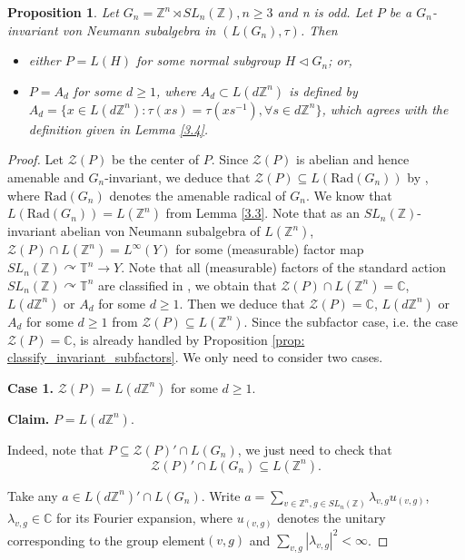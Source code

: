 \documentclass[12pt]{amsart}
\newtheorem{prop}[theorem]{Proposition}
\theoremstyle{definition}
\theoremstyle{remark}
\begin{document}
\begin{prop}\label{prop: version of prop 3.1}
Let $G_{n}=\mathbb{Z}^n\rtimes SL_n(\mathbb{Z}),n\ge3$ and n is odd. Let $P$ be a $G_{n}$-invariant von Neumann subalgebra in $(L(G_{n}),\tau)$. Then 
\begin{itemize}
\item either $P=L(H)$ for some normal subgroup $H\lhd G_{n}$; or,
\item $P=A_d$ for some $d\geq 1$, where $A_d\subset L(d\mathbb{Z}^n)$ is defined by $A_d=\{x\in L(d\mathbb{Z}^n): \tau(xs)=\tau(xs^{-1}), \forall s\in d\mathbb{Z}^n\}$, which agrees with the definition given in Lemma \ref{3.4}.
\end{itemize}
\end{prop}
\begin{proof}
Let $\mathcal{Z}(P)$ be the center of $P$. Since $\mathcal{Z}(P)$ is abelian and hence amenable and $G_n$-invariant, we deduce that $\mathcal{Z}(P) \subseteq L(\text{Rad}(G_n))$ by \cite[Theorem A]{aho}, where $\text{Rad}(G_n)$ denotes the amenable radical of $G_n$. We know that $L(\text{Rad}(G_n)) = L(\mathbb{Z}^n)$ from Lemma \ref{3.3}. Note that as an $SL_n(\mathbb{Z})$-invariant abelian von Neumann subalgebra of $L(\mathbb{Z}^n)$, $\mathcal{Z}(P)\cap L(\mathbb{Z}^n)=L^{\infty}(Y)$ for some (measurable) factor map  $SL_n(\mathbb{Z})\curvearrowright \mathbb{T}^n\rightarrow Y$. 
Note that all (measurable) factors of the standard action $SL_n(\mathbb{Z})\curvearrowright \mathbb{T}^n$ are classified in  \cite[Example 5.9]{wit}, we obtain that $\mathcal{Z}(P)\cap L(\mathbb{Z}^n)=\mathbb{C}$, $L(d\mathbb{Z}^n)$ or $A_d$ for some $d\geq 1$. Then we deduce that $\mathcal{Z}(P)=\mathbb{C}$, $L(d\mathbb{Z}^n)$ or $A_d$ for some $d\geq 1$ from $\mathcal{Z}(P) \subseteq L(\mathbb{Z}^n)$. Since the subfactor case, i.e. the case $\mathcal{Z}(P)=\mathbb{C}$, is already handled by Proposition \ref{prop: classify_invariant_subfactors}. We only need to consider two cases.

\textbf{Case 1.} $\mathcal{Z}(P) = L(d\mathbb{Z}^n)$ for some $d\ge 1$.

\textbf{Claim.} $P = L(d\mathbb{Z}^n)$.

Indeed, note that $    P\subseteq \mathcal{Z}(P)' \cap L(G_{n})$, we just need to check that 
\begin{equation*}
    \mathcal{Z}(P)' \cap L(G_{n}) \subseteq L(\mathbb{Z}^n).
\end{equation*}

Take any $a \in L(d\mathbb{Z}^n)' \cap L(G_{n})$. Write  $a=\sum_{v\in \mathbb{Z}^n, g\in SL_{n}(\mathbb{Z})}\lambda_{v,g}u_{(v,g)}$, $\lambda_{v,g} \in \mathbb{C}$ for its Fourier expansion, where $u_{(v,g)}$ denotes the unitary corresponding to the group element$(v,g)$ and $\sum\limits_{v,g} |\lambda_{v,g}|^2 <\infty$. 


\end{proof}
\end{document}
